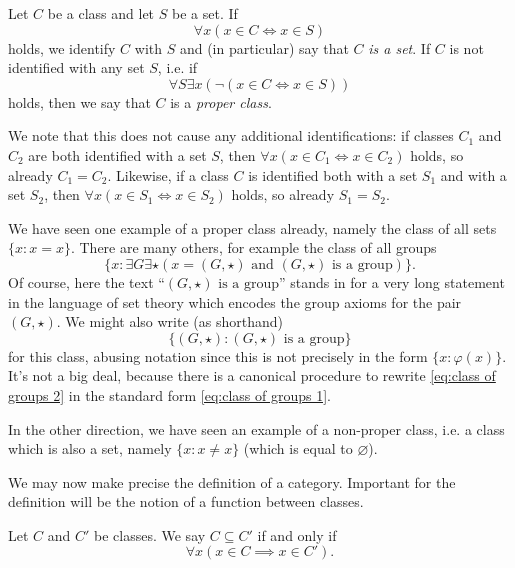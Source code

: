 \begin{convention}\label{conv:appendix:size issues:classes which are sets}
    Let $C$ be a class and let $S$ be a set. If
    \[\forall x (x \in C \iff x \in S)\]
    holds, we identify $C$ with $S$ and (in particular) say that $C$ \emph{is a set}. If $C$ is not identified with any set $S$, i.e. if
    \[\forall S \exists x (\lnot(x \in C \iff x \in S))\]
    holds, then we say that $C$ is a \emph{proper class}.
\end{convention}

We note that this does not cause any additional identifications: if classes $C_1$ and $C_2$ are both identified with a set $S$, then $\forall x (x \in C_1 \iff x \in C_2)$ holds, so already $C_1 = C_2$. Likewise, if a class $C$ is identified both with a set $S_1$ and with a set $S_2$, then $\forall x (x \in S_1 \iff x \in S_2)$ holds, so already $S_1 = S_2$.

We have seen one example of a proper class already, namely the class of all sets $\{x : x = x\}$. There are many others, for example the class of all groups
\begin{equation}\label{eq:class of groups 1}
    \{x : \exists G \exists {\star} (x = (G,\star) \text{ and } (G,\star)\text{ is a group})\}.
\end{equation}
Of course, here the text ``$(G,\star)\text{ is a group}$'' stands in for a very long statement in the language of set theory which encodes the group axioms for the pair $(G, \star)$. We might also write (as shorthand)
\begin{equation}\label{eq:class of groups 2}
    \{(G,\star) : (G,\star)\text{ is a group}\}
\end{equation}
for this class, abusing notation since this is not precisely in the form $\{x : \varphi(x)\}$. It's not a big deal, because there is a canonical procedure to rewrite \eqref{eq:class of groups 2} in the standard form \eqref{eq:class of groups 1}.

In the other direction, we have seen an example of a non-proper class, i.e. a class which is also a set, namely $\{x : x \neq x\}$ (which is equal to $\varnothing$).

We may now make precise the definition of a category. Important for the definition will be the notion of a function between classes.

\begin{definition}\label{def:appendix:size issues:subclass}
    Let $C$ and $C'$ be classes. We say $C \subseteq C'$ if and only if
    \[\forall x (x \in C \implies x \in C').\]
\end{definition}

